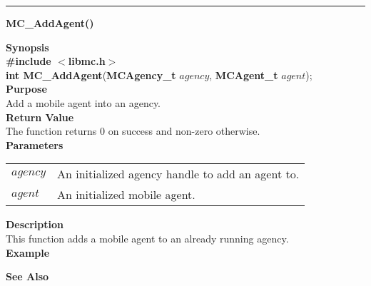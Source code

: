 \noindent
\vspace{5pt}
\rule{6.5in}{0.015in}
\noindent
{}
{\LARGE \bf MC\_AddAgent()}\\
\label{api:MC_AddAgent()}

\noindent
{\bf Synopsis}\\
{\bf \#include $<$libmc.h$>$}\\
{\bf int MC\_AddAgent}({\bf MCAgency\_t} $agency$, {\bf MCAgent\_t} $agent$);\\

\noindent
{\bf Purpose}\\
Add a mobile agent into an agency.\\

\noindent
{\bf Return Value}\\
The function returns 0 on success and non-zero otherwise.\\

\noindent
{\bf Parameters}
\vspace{-0.1in}
\begin{description}
\item
\begin{tabular}{p{10 mm}p{145 mm}} 
$agency$ & An initialized agency handle to add an agent to.\\
$agent$ & An initialized mobile agent.
\end{tabular}
\end{description}

\noindent
{\bf Description}\\
This function adds a mobile agent to an already running agency.\\

\noindent
{\bf Example}\\
\noindent
{\footnotesize}

\noindent
{\bf See Also}\\

